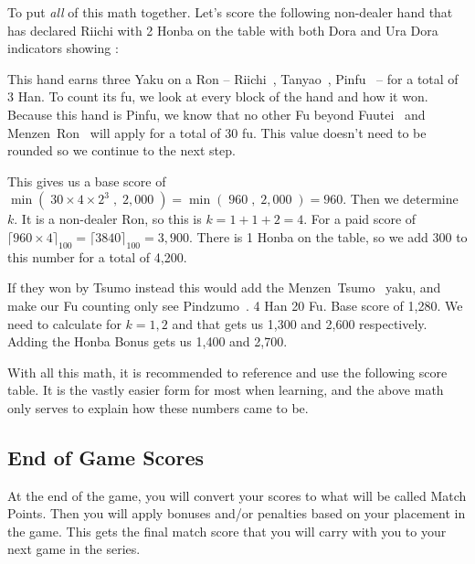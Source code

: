 To put \textit{all} of this math together. Let's score the following non-dealer hand that has declared Riichi with 2 Honba on the table with both Dora and Ura Dora indicators showing {}: {}

This hand earns three Yaku on a Ron -- Riichi~, Tanyao~, Pinfu~ -- for a total of 3 Han. To count its fu, we look at every block of the hand and how it won. Because this hand is Pinfu, we know that no other Fu beyond Fuutei~ and Menzen~Ron~ will apply for a total of 30 fu. This value doesn't need to be rounded so we continue to the next step.

This gives us a base score of \(\min\left(\; 30 \times 4 \times 2^{3} \;,\; 2,000 \;\right) = \min\left(\; 960 \;,\; 2,000 \;\right) = 960\). Then we determine \(k\). It is a non-dealer Ron, so this is \(k = 1 + 1 + 2 = 4\). For a paid score of \(\lceil 960 \times 4 \rceil_{100} = \lceil 3840 \rceil_{100} = 3,900\). There is 1 Honba on the table, so we add 300 to this number for a total of 4,200.

If they won by Tsumo instead this would add the Menzen~Tsumo~ yaku, and make our Fu counting only see Pindzumo~. 4 Han 20 Fu. Base score of 1,280. We need to calculate for \(k=1, 2\) and that gets us 1,300 and 2,600 respectively. Adding the Honba Bonus gets us 1,400 and 2,700.

With all this math, it is recommended to reference and use the following score table. It is the vastly easier form for most when learning, and the above math only serves to explain how these numbers came to be.



\subsection{End of Game Scores}\label{core:ssec:end-scores}

At the end of the game, you will convert your scores to what will be called Match Points. Then you will apply bonuses and/or penalties based on your placement in the game. This gets the final match score that you will carry with you to your next game in the series.

